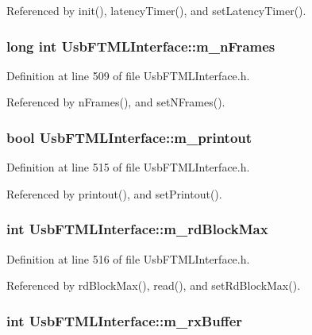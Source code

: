 Referenced by init(), latencyTimer(), and setLatencyTimer().\hypertarget{classUsbFTMLInterface_ac7b9fb80fb8653a366c53ce3567cb823}{
\subsubsection[{m\_\-nFrames}]{\setlength{\rightskip}{0pt plus 5cm}long int {\bf UsbFTMLInterface::m\_\-nFrames}}}
\label{classUsbFTMLInterface_ac7b9fb80fb8653a366c53ce3567cb823}


Definition at line 509 of file UsbFTMLInterface.h.

Referenced by nFrames(), and setNFrames().\hypertarget{classUsbFTMLInterface_a57b909e50c9eba8ffbcb66e0d9649632}{
\subsubsection[{m\_\-printout}]{\setlength{\rightskip}{0pt plus 5cm}bool {\bf UsbFTMLInterface::m\_\-printout}}}
\label{classUsbFTMLInterface_a57b909e50c9eba8ffbcb66e0d9649632}


Definition at line 515 of file UsbFTMLInterface.h.

Referenced by printout(), and setPrintout().\hypertarget{classUsbFTMLInterface_af950506bbfb1e198af7ea2141058d018}{
\subsubsection[{m\_\-rdBlockMax}]{\setlength{\rightskip}{0pt plus 5cm}int {\bf UsbFTMLInterface::m\_\-rdBlockMax}}}
\label{classUsbFTMLInterface_af950506bbfb1e198af7ea2141058d018}


Definition at line 516 of file UsbFTMLInterface.h.

Referenced by rdBlockMax(), read(), and setRdBlockMax().\hypertarget{classUsbFTMLInterface_a8f0f8bb2a4fe14ca4890695f41fbcbf8}{
\subsubsection[{m\_\-rxBuffer}]{\setlength{\rightskip}{0pt plus 5cm}int {\bf UsbFTMLInterface::m\_\-rxBuffer}}}
\label{classUsbFTMLInterface_a8f0f8bb2a4fe14ca4890695f41fbcbf8}



